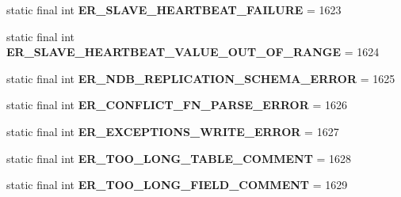\begin{DoxyCompactItemize}
static final int {\bfseries E\+R\+\_\+\+S\+L\+A\+V\+E\+\_\+\+H\+E\+A\+R\+T\+B\+E\+A\+T\+\_\+\+F\+A\+I\+L\+U\+RE} = 1623
\item 
\mbox{\label{classcom_1_1mysql_1_1jdbc_1_1_mysql_error_numbers_a84e7ac5e8bec8dffccf8c21065145d11}} 
static final int {\bfseries E\+R\+\_\+\+S\+L\+A\+V\+E\+\_\+\+H\+E\+A\+R\+T\+B\+E\+A\+T\+\_\+\+V\+A\+L\+U\+E\+\_\+\+O\+U\+T\+\_\+\+O\+F\+\_\+\+R\+A\+N\+GE} = 1624
\item 
\mbox{\label{classcom_1_1mysql_1_1jdbc_1_1_mysql_error_numbers_acb6470bb8fc161419a39f8994f131737}} 
static final int {\bfseries E\+R\+\_\+\+N\+D\+B\+\_\+\+R\+E\+P\+L\+I\+C\+A\+T\+I\+O\+N\+\_\+\+S\+C\+H\+E\+M\+A\+\_\+\+E\+R\+R\+OR} = 1625
\item 
\mbox{\label{classcom_1_1mysql_1_1jdbc_1_1_mysql_error_numbers_a050631faa4eed323b90572a48614ca4d}} 
static final int {\bfseries E\+R\+\_\+\+C\+O\+N\+F\+L\+I\+C\+T\+\_\+\+F\+N\+\_\+\+P\+A\+R\+S\+E\+\_\+\+E\+R\+R\+OR} = 1626
\item 
\mbox{\label{classcom_1_1mysql_1_1jdbc_1_1_mysql_error_numbers_a98a35e41990d854e71035e98a0b64417}} 
static final int {\bfseries E\+R\+\_\+\+E\+X\+C\+E\+P\+T\+I\+O\+N\+S\+\_\+\+W\+R\+I\+T\+E\+\_\+\+E\+R\+R\+OR} = 1627
\item 
\mbox{\label{classcom_1_1mysql_1_1jdbc_1_1_mysql_error_numbers_a1728cffdc05352ad7ae5587b3d49eb96}} 
static final int {\bfseries E\+R\+\_\+\+T\+O\+O\+\_\+\+L\+O\+N\+G\+\_\+\+T\+A\+B\+L\+E\+\_\+\+C\+O\+M\+M\+E\+NT} = 1628
\item 
\mbox{\label{classcom_1_1mysql_1_1jdbc_1_1_mysql_error_numbers_aedaac9853f69148c7c439d32ecfc59e9}} 
static final int {\bfseries E\+R\+\_\+\+T\+O\+O\+\_\+\+L\+O\+N\+G\+\_\+\+F\+I\+E\+L\+D\+\_\+\+C\+O\+M\+M\+E\+NT} = 1629
\item 
\mbox{\label{classcom_1_1mysql_1_1jdbc_1_1_mysql_error_numbers_a7ecc73d7e7de6ab52f985ed3596cd566}} 

\end{DoxyCompactItemize}
